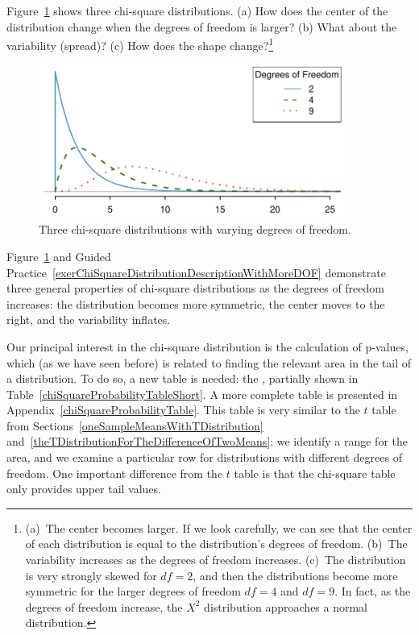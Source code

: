 \begin{exercise}\label{exerChiSquareDistributionDescriptionWithMoreDOF}
Figure~\ref{chiSquareDistributionWithInceasingDF} shows three chi-square distributions. (a) How does the center of the distribution change when the degrees of freedom is larger? (b) What about the variability (spread)? (c) How does the shape change?\footnote{(a)~The center becomes larger. If we look carefully, we can see that the center of each distribution is equal to the distribution's degrees of freedom. (b)~The variability increases as the degrees of freedom increases. (c)~The distribution is very strongly skewed for $df=2$, and then the distributions become more symmetric for the larger degrees of freedom $df=4$ and $df=9$. In fact, as the degrees of freedom increase, the $X^2$ distribution approaches a normal distribution. }
\end{exercise}

\begin{figure}[h]
\centering
\includegraphics[width=0.9\textwidth]{ch_inference_for_props/figures/chiSquareDistributionWithInceasingDF/chiSquareDistributionWithInceasingDF}
\caption{Three chi-square distributions with varying degrees of freedom.}
\label{chiSquareDistributionWithInceasingDF}
\end{figure}

Figure~\ref{chiSquareDistributionWithInceasingDF} and Guided Practice~\ref{exerChiSquareDistributionDescriptionWithMoreDOF} demonstrate three general properties of chi-square distributions as the degrees of freedom increases: the distribution becomes more symmetric, the center moves to the right, and the variability inflates.

Our principal interest in the chi-square distribution is the calculation of p-values, which (as we have seen before) is related to finding the relevant area in the tail of a distribution. To do so, a new table is needed: the , partially shown in Table~\ref{chiSquareProbabilityTableShort}. A more complete table is presented in Appendix~\vref{chiSquareProbabilityTable}. This table is very similar to the $t$ table from Sections~\ref{oneSampleMeansWithTDistribution} and~\ref{theTDistributionForTheDifferenceOfTwoMeans}: we identify a range for the area, and we examine a particular row for distributions with different degrees of freedom. One important difference from the $t$ table is that the chi-square table only provides upper tail values.

